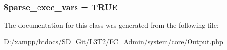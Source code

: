 \subsubsection[{\$parse\+\_\+exec\+\_\+vars}]{\setlength{\rightskip}{0pt plus 5cm}\$parse\+\_\+exec\+\_\+vars = T\+R\+U\+E}\label{class_c_i___output_a254d73d122352494697cdba0c509086d}


The documentation for this class was generated from the following file\+:\begin{DoxyCompactItemize}
\item 
D\+:/xampp/htdocs/\+S\+D\+\_\+\+Git/\+L3\+T2/\+F\+C\+\_\+\+Admin/system/core/\hyperlink{_output_8php}{Output.\+php}\end{DoxyCompactItemize}
